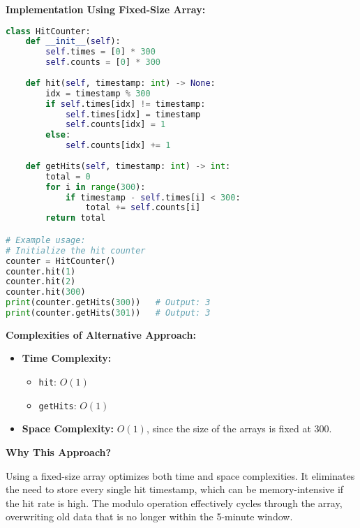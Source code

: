 \textbf{Implementation Using Fixed-Size Array:}

\begin{fullwidth}
\begin{lstlisting}[language=Python]
class HitCounter:
    def __init__(self):
        self.times = [0] * 300
        self.counts = [0] * 300
    
    def hit(self, timestamp: int) -> None:
        idx = timestamp % 300
        if self.times[idx] != timestamp:
            self.times[idx] = timestamp
            self.counts[idx] = 1
        else:
            self.counts[idx] += 1
    
    def getHits(self, timestamp: int) -> int:
        total = 0
        for i in range(300):
            if timestamp - self.times[i] < 300:
                total += self.counts[i]
        return total

# Example usage:
# Initialize the hit counter
counter = HitCounter()
counter.hit(1)
counter.hit(2)
counter.hit(300)
print(counter.getHits(300))   # Output: 3
print(counter.getHits(301))   # Output: 3
\end{lstlisting}
\end{fullwidth}

\textbf{Complexities of Alternative Approach:}

\begin{itemize}
    \item \textbf{Time Complexity:}
        \begin{itemize}
            \item \texttt{hit}: \(O(1)\)
            \item \texttt{getHits}: \(O(1)\)
        \end{itemize}
    \item \textbf{Space Complexity:} \(O(1)\), since the size of the arrays is fixed at 300.
\end{itemize}

\textbf{Why This Approach?}

Using a fixed-size array optimizes both time and space complexities. It eliminates the need to store every single hit timestamp, which can be memory-intensive if the hit rate is high. The modulo operation effectively cycles through the array, overwriting old data that is no longer within the 5-minute window.

